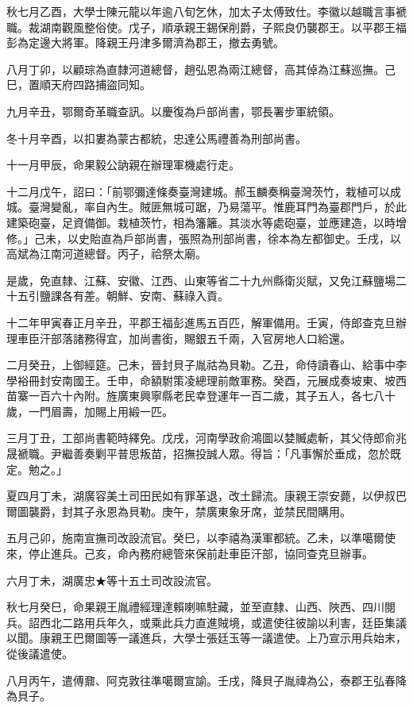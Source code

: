 \begin{pinyinscope}
秋七月乙酉，大學士陳元龍以年逾八旬乞休，加太子太傅致仕。李徽以越職言事褫職。裁湖南觀風整俗使。戊子，順承親王錫保削爵，子熙良仍襲郡王。以平郡王福彭為定邊大將軍。降親王丹津多爾濟為郡王，撤去勇號。

八月丁卯，以顧琮為直隸河道總督，趙弘恩為兩江總督，高其倬為江蘇巡撫。己巳，置順天府四路捕盜同知。

九月辛丑，鄂爾奇革職查訊。以慶復為戶部尚書，鄂長署步軍統領。

冬十月辛酉，以扣婁為蒙古都統，忠達公馬禮善為刑部尚書。

十一月甲辰，命果毅公訥親在辦理軍機處行走。

十二月戊午，詔曰：「前鄂彌達條奏臺灣建城。郝玉麟奏稱臺灣茨竹，栽植可以成城。臺灣變亂，率自內生。賊匪無城可踞，乃易蕩平。惟鹿耳門為臺郡門戶，於此建築砲臺，足資備御。栽植茨竹，相為籓籬。其淡水等處砲臺，並應建造，以時增修。」己未，以史貽直為戶部尚書，張照為刑部尚書，徐本為左都御史。壬戌，以高斌為江南河道總督。丙子，祫祭太廟。

是歲，免直隸、江蘇、安徽、江西、山東等省二十九州縣衛災賦，又免江蘇鹽場二十五引鹽課各有差。朝鮮、安南、蘇祿入貢。

十二年甲寅春正月辛丑，平郡王福彭進馬五百匹，解軍備用。壬寅，侍郎查克旦辦理車臣汗部落諸務得宜，加尚書銜，賜銀五千兩，入官房地人口給還。

二月癸丑，上御經筵。己未，晉封貝子胤祜為貝勒。乙丑，命侍讀春山、給事中李學裕冊封安南國王。壬申，命額駙策凌總理前敵軍務。癸酉，元展成奏坡東、坡西苗寨一百六十內附。旌廣東興寧縣老民幸登運年一百二歲，其子五人，各七八十歲，一門眉壽，加賜上用緞一匹。

三月丁丑，工部尚書範時繹免。戊戌，河南學政俞鴻圖以婪贓處斬，其父侍郎俞兆晟褫職。尹繼善奏剿平普思叛苗，招撫投誠人眾。得旨：「凡事懈於垂成，忽於既定。勉之。」

夏四月丁未，湖廣容美土司田民如有罪革退，改土歸流。康親王崇安薨，以伊叔巴爾圖襲爵，封其子永恩為貝勒。庚午，禁廣東象牙席，並禁民間購用。

五月己卯，施南宣撫司改設流官。癸巳，以李禧為漢軍都統。乙未，以準噶爾使來，停止進兵。己亥，命內務府總管來保前赴車臣汗部，協同查克旦辦事。

六月丁未，湖廣忠★等十五土司改設流官。

秋七月癸巳，命果親王胤禮經理達賴喇嘛駐藏，並至直隸、山西、陜西、四川閱兵。詔西北二路用兵年久，或乘此兵力直進賊境，或遣使往彼諭以利害，廷臣集議以聞。康親王巴爾圖等一議進兵，大學士張廷玉等一議遣使。上乃宣示用兵始末，從後議遣使。

八月丙午，遣傅鼐、阿克敦往準噶爾宣諭。壬戌，降貝子胤禕為公，泰郡王弘春降為貝子。


\end{pinyinscope}
